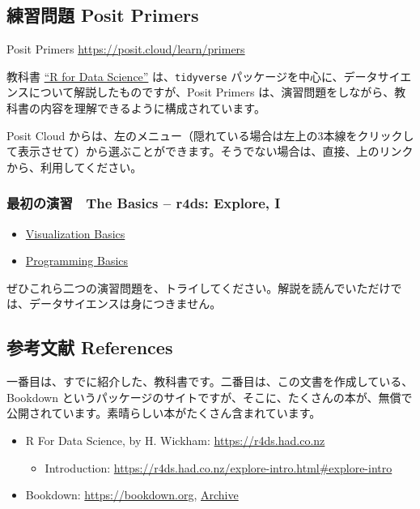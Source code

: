 \documentclass[
]{bxjsbook}
\providecommand{\tightlist}{%
  \setlength{\itemsep}{0pt}\setlength{\parskip}{0pt}}
\theoremstyle{definition}
\theoremstyle{definition}
\theoremstyle{definition}
\theoremstyle{definition}
\theoremstyle{remark}
\begin{document}
\hypertarget{ux7df4ux7fd2ux554fux984c-posit-primers}{%
\subsection{練習問題 Posit Primers}\label{ux7df4ux7fd2ux554fux984c-posit-primers}}

Posit Primers \url{https://posit.cloud/learn/primers}

教科書 \href{https://r4ds.had.co.nz}{``R for Data Science''} は、\texttt{tidyverse} パッケージを中心に、データサイエンスについて解説したものですが、Posit Primers は、演習問題をしながら、教科書の内容を理解できるように構成されています。

Posit Cloud からは、左のメニュー（隠れている場合は左上の3本線をクリックして表示させて）から選ぶことができます。そうでない場合は、直接、上のリンクから、利用してください。

\hypertarget{ux6700ux521dux306eux6f14ux7fd2-the-basics-r4ds-explore-i}{%
\subsubsection{最初の演習　The Basics -- r4ds: Explore, I}\label{ux6700ux521dux306eux6f14ux7fd2-the-basics-r4ds-explore-i}}

\begin{itemize}
\tightlist
\item
  \href{https://rstudio.cloud/learn/primers/1.1}{Visualization Basics}
\item
  \href{https://rstudio.cloud/learn/primers/1.2}{Programming Basics}
\end{itemize}

ぜひこれら二つの演習問題を、トライしてください。解説を読んでいただけでは、データサイエンスは身につきません。

\hypertarget{ux53c2ux8003ux6587ux732e-references}{%
\subsection{参考文献 References}\label{ux53c2ux8003ux6587ux732e-references}}

一番目は、すでに紹介した、教科書です。二番目は、この文書を作成している、Bookdown というパッケージのサイトですが、そこに、たくさんの本が、無償で公開されています。素晴らしい本がたくさん含まれています。

\begin{itemize}
\tightlist
\item
  R For Data Science, by H. Wickham: \url{https://r4ds.had.co.nz}

  \begin{itemize}
  \tightlist
  \item
    Introduction: \url{https://r4ds.had.co.nz/explore-intro.html\#explore-intro}
  \end{itemize}
\item
  Bookdown: \url{https://bookdown.org}, \href{https://bookdown.org/home/archive/}{Archive}
\end{itemize}
\end{document}
